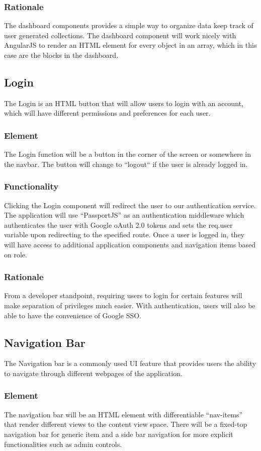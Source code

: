 \documentclass[journal,10pt,onecolumn,compsoc]{IEEEtran}
\begin{document}
			\subsubsection{Rationale} 
				The dashboard components provides a simple way to organize data keep track of user generated collections. 
				The dashboard component will work nicely with AngularJS to render an HTML element for every object in an array, which in this case are the blocks in the dashboard.
	
		\subsection{Login}
			The Login is an HTML button that will allow users to login with an account, which will have different permissions and preferences for each user.
			\subsubsection{Element}
				The Login function will be a button in the corner of the screen or somewhere in the navbar. The button will change to ``logout`` if the user is already logged in.
			\subsubsection{Functionality}
				Clicking the Login component will redirect the user to our authentication service. 
				The application will use ``PassportJS'' as an authentication middleware which authenticates the user with Google oAuth 2.0 tokens and sets the req.user variable upon redirecting to the specified route. 
				Once a user is logged in, they will have access to additional application components and navigation items based on role.
			\subsubsection{Rationale}
				From a developer standpoint, requiring users to login for certain features will make separation of privileges much easier. With authentication, users will also be able to have the convenience of Google SSO.
	
		\subsection{Navigation Bar}
			The Navigation bar is a commonly used UI feature that provides users the ability to navigate through different webpages of the application.
			\subsubsection{Element}
				The navigation bar will be an HTML element with differentiable ``nav-items'' that render different views to the content view space. There will be a fixed-top navigation bar for generic item and a side bar navigation for more explicit functionalities such as admin controls. 
\end{document}
